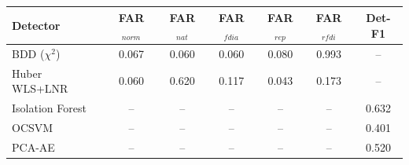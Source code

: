 \begin{tabular}{lcccccc}
\toprule
Detector & FAR$_{norm}$ & FAR$_{nat}$ & FAR$_{fdia}$ & FAR$_{rep}$ & FAR$_{rfdi}$ & Det-F1 \\
\midrule
BDD ($\chi^2$) & 0.067 & 0.060 & 0.060 & 0.080 & 0.993 & -- \\
Huber WLS+LNR & 0.060 & 0.620 & 0.117 & 0.043 & 0.173 & -- \\
Isolation Forest & -- & -- & -- & -- & -- & 0.632 \\
OCSVM & -- & -- & -- & -- & -- & 0.401 \\
PCA-AE & -- & -- & -- & -- & -- & 0.520 \\
\bottomrule
\end{tabular}
